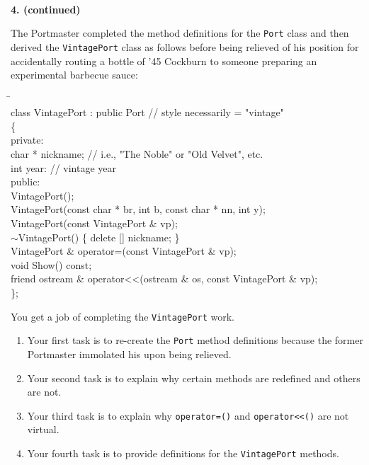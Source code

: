 \documentclass[10 pt]{amsart}
\newlength{\cwidth}
\newenvironment{cpartContinued}[2][\cwidth]
	{%
		\\ %
		\textbf{#2. (continued)}%
		\\
		\phantom{#2. }
		\begin{minipage}[t]{#1}%
		\setlength{\parindent}{0pt}%
		\setlength{\parskip}{2ex}%
	}
	{%
		\end{minipage}%
	}
\newcommand{\ttt}[1]{\texttt{#1}}
\begin{document}
	\begin{cpartContinued}{4}
		The Portmaster completed the method definitions for the
		\ttt{Port} class and then derived the \ttt{VintagePort} class
		as follows before being relieved of his position for
		accidentally routing a bottle of '45 Cockburn to someone
		preparing an experimental barbecue sauce: 
		{\ttfamily
			\begin{tabbing}
				\phantom{\qquad}\=\hspace{6cm}\=\\	
				class VintagePort : public Port 
					// style necessarily = "vintage" \\
				\{ 
				\+ \\
				\< private: \\
					char * nickname; \> 
							// i.e., "The Noble" or "Old Velvet", etc. \\
					int year: \> // vintage year \\
				\< public: \\
					VintagePort(); \\
					VintagePort(const char * br, 
						int b, const char * nn, int y); \\
					VintagePort(const VintagePort \& vp); \\
					$\sim$VintagePort() \{ delete [] nickname; \} \\
					VintagePort \& operator=(const VintagePort \& vp); \\
					void Show() const; \\
					friend ostream \& 
						operator<<(ostream \& os, const VintagePort \& vp); \\
				\< \};
			\end{tabbing}
		}	
		You get a job of completing the \ttt{VintagePort} work.
		\begin{enumerate}%
			\item 
				Your first task is to re-create the \ttt{Port} method
				definitions because the former Portmaster immolated his
				upon being relieved. 
			\item
				Your second task is to explain why certain methods are
				redefined and others are not.
			\item
				Your third task is to explain why \ttt{operator=()}
				and \ttt{operator<<()} are not virtual.
			\item
				Your fourth task is to provide definitions for the 
				\ttt{VintagePort} methods.
		\end{enumerate}
	\end{cpartContinued}
\end{document}
